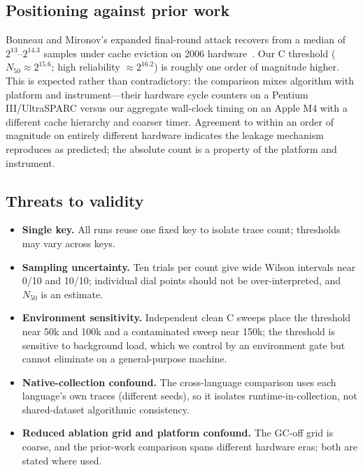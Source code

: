 \documentclass[11pt]{article}
\begin{document}
\subsection{Positioning against prior work}
\label{sec:an-prior}
Bonneau and Mironov's expanded final-round attack recovers from a median of
$2^{13}$--$2^{14.3}$ samples under cache eviction on 2006
hardware~\cite{bonneau06}. Our C threshold ($N_{50}\approx2^{15.6}$; high
reliability $\approx2^{16.2}$) is roughly one order of magnitude higher. This is
expected rather than contradictory: the comparison mixes algorithm with platform
and instrument---their hardware cycle counters on a Pentium III/UltraSPARC versus
our aggregate wall-clock timing on an Apple M4 with a different cache hierarchy
and coarser timer. Agreement to within an order of magnitude on entirely
different hardware indicates the leakage mechanism reproduces as predicted; the
absolute count is a property of the platform and instrument.

\subsection{Threats to validity}
\label{sec:an-threats}
\begin{itemize}
  \item \textbf{Single key.} All runs reuse one fixed key to isolate trace count;
        thresholds may vary across keys.
  \item \textbf{Sampling uncertainty.} Ten trials per count give wide Wilson
        intervals near 0/10 and 10/10; individual dial points should not be
        over-interpreted, and $N_{50}$ is an estimate.
  \item \textbf{Environment sensitivity.} Independent clean C sweeps place the
        threshold near 50k and 100k and a contaminated sweep near 150k; the
        threshold is sensitive to background load, which we control by an
        environment gate but cannot eliminate on a general-purpose machine.
  \item \textbf{Native-collection confound.} The cross-language comparison uses
        each language's own traces (different seeds), so it isolates
        runtime-in-collection, not shared-dataset algorithmic consistency.
  \item \textbf{Reduced ablation grid and platform confound.} The GC-off grid is
        coarse, and the prior-work comparison spans different hardware eras; both
        are stated where used.
\end{itemize}
\end{document}
